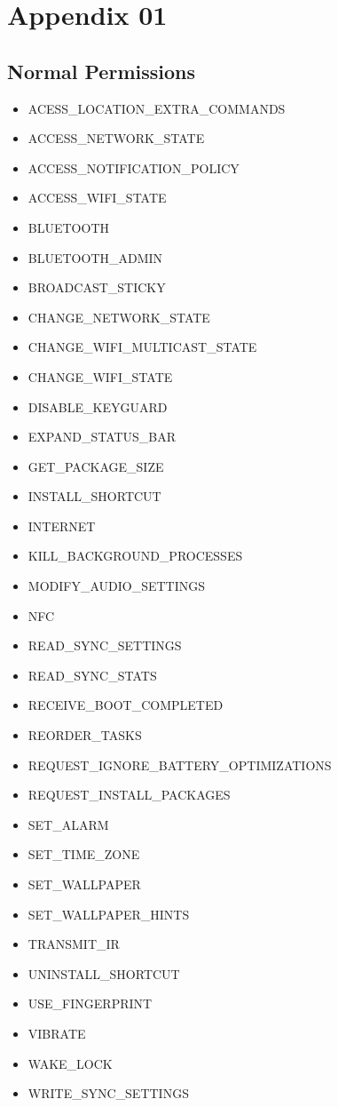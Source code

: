 \chapter*{Appendix 01}
\section*{Normal Permissions}
\begin{itemize}
\item[] ACESS\_LOCATION\_EXTRA\_COMMANDS
\item[] ACCESS\_NETWORK\_STATE
\item[] ACCESS\_NOTIFICATION\_POLICY
\item[] ACCESS\_WIFI\_STATE
\item[] BLUETOOTH
\item[] BLUETOOTH\_ADMIN
\item[] BROADCAST\_STICKY
\item[] CHANGE\_NETWORK\_STATE
\item[] CHANGE\_WIFI\_MULTICAST\_STATE
\item[] CHANGE\_WIFI\_STATE
\item[] DISABLE\_KEYGUARD
\item[] EXPAND\_STATUS\_BAR
\item[] GET\_PACKAGE\_SIZE
\item[] INSTALL\_SHORTCUT
\item[] INTERNET 
\item[] KILL\_BACKGROUND\_PROCESSES
\item[] MODIFY\_AUDIO\_SETTINGS
\item[] NFC
\item[] READ\_SYNC\_SETTINGS
\item[] READ\_SYNC\_STATS
\item[] RECEIVE\_BOOT\_COMPLETED
\item[] REORDER\_TASKS
\item[] REQUEST\_IGNORE\_BATTERY\_OPTIMIZATIONS
\item[] REQUEST\_INSTALL\_PACKAGES
\item[] SET\_ALARM
\item[] SET\_TIME\_ZONE
\item[] SET\_WALLPAPER
\item[] SET\_WALLPAPER\_HINTS
\item[] TRANSMIT\_IR
\item[] UNINSTALL\_SHORTCUT
\item[] USE\_FINGERPRINT
\item[] VIBRATE
\item[] WAKE\_LOCK
\item[] WRITE\_SYNC\_SETTINGS
\end{itemize}

